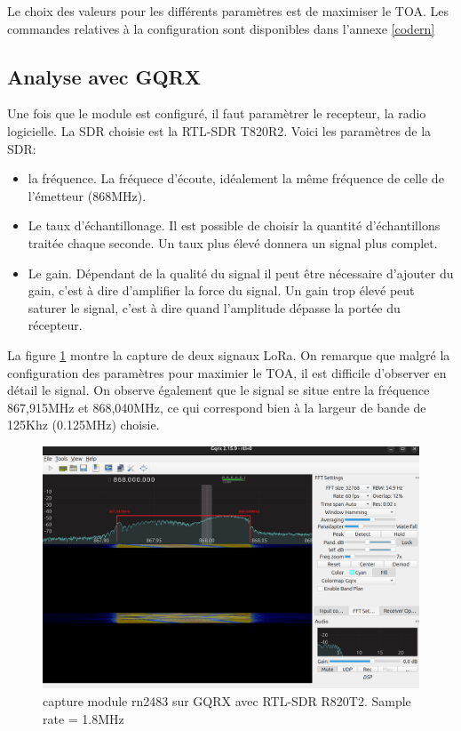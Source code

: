 \vspace{0.1cm}

Le choix des valeurs pour les différents paramètres est de maximiser le \ac{TOA}. Les commandes relatives à la configuration sont disponibles dans l'annexe \ref{codern}

\subsection{Analyse avec GQRX}

Une fois que le module est configuré, il faut paramètrer le recepteur, la radio logicielle. La \ac{SDR} choisie est la RTL-SDR T820R2. Voici les paramètres de la \ac{SDR}:

\vspace{0.1cm}

\begin{itemize}
\item la fréquence. La fréquece d'écoute, idéalement la même fréquence de celle de l'émetteur (868MHz).
\item Le taux d'échantillonage. Il est possible de choisir la quantité d'échantillons traitée chaque seconde. Un taux plus élevé donnera un signal plus complet.
\item Le gain. Dépendant de la qualité du signal il peut être nécessaire d'ajouter du gain, c'est à dire d'amplifier la force du signal. Un gain trop élevé peut saturer le signal, c'est à dire quand l'amplitude dépasse la portée du récepteur.
\end{itemize}

\vspace{0.1cm}

La figure \ref{term301} montre la capture de deux signaux LoRa. On remarque que malgré la configuration des paramètres pour maximier le \ac{TOA}, il est difficile d'observer en détail le signal. On observe également que le signal se situe entre la fréquence 867,915MHz et 868,040MHz, ce qui correspond bien à la largeur de bande de 125Khz (0.125MHz) choisie.

\begin{figure}[h]
\centering

\includegraphics[scale=0.28]{images/gqrx4.png}
\caption{capture module rn2483 sur GQRX avec RTL-SDR R820T2. Sample rate = 1.8MHz}\label{term301}
\end{figure}

